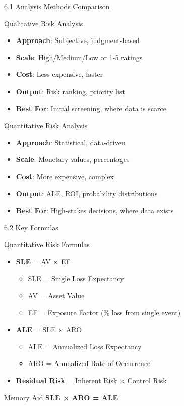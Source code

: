 \documentclass{beamer}
\begin{document}
	\begin{frame}{6.1 Analysis Methods Comparison}
		\begin{block}{Qualitative Risk Analysis}
			\begin{itemize}
				\item \textbf{Approach}: Subjective, judgment-based
				\item \textbf{Scale}: High/Medium/Low or 1-5 ratings
				\item \textbf{Cost}: Less expensive, faster
				\item \textbf{Output}: Risk ranking, priority list
				\item \textbf{Best For}: Initial screening, where data is scarce
			\end{itemize}
		\end{block}
		
		\begin{block}{Quantitative Risk Analysis}
			\begin{itemize}
				\item \textbf{Approach}: Statistical, data-driven
				\item \textbf{Scale}: Monetary values, percentages
				\item \textbf{Cost}: More expensive, complex
				\item \textbf{Output}: ALE, ROI, probability distributions
				\item \textbf{Best For}: High-stakes decisions, where data exists
			\end{itemize}
		\end{block}
	\end{frame}
	
	\begin{frame}{6.2 Key Formulas}
		\begin{block}{Quantitative Risk Formulas}
			\begin{itemize}
				\item \textbf{SLE} = AV × EF
				\begin{itemize}
					\item SLE = Single Loss Expectancy
					\item AV = Asset Value
					\item EF = Exposure Factor (\% loss from single event)
				\end{itemize}
				\item \textbf{ALE} = SLE × ARO
				\begin{itemize}
					\item ALE = Annualized Loss Expectancy
					\item ARO = Annualized Rate of Occurrence
				\end{itemize}
				\item \textbf{Residual Risk} = Inherent Risk × Control Risk
			\end{itemize}
		\end{block}
		
		\begin{alertblock}{Memory Aid}
			\textbf{SLE × ARO = ALE}
		\end{alertblock}
	\end{frame}
	
\end{document}
